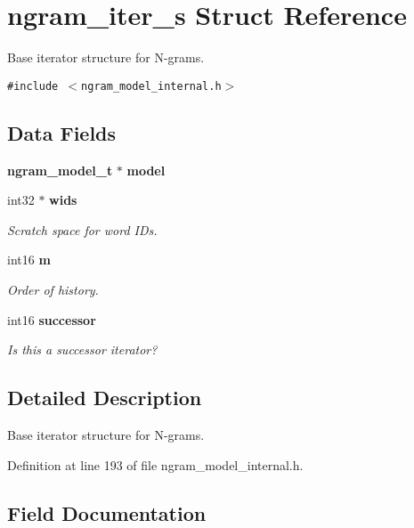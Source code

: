 \section{ngram\_\-iter\_\-s Struct Reference}
\label{structngram__iter__s}
Base iterator structure for N-grams.  


{\tt \#include $<$ngram\_\-model\_\-internal.h$>$}

\subsection*{Data Fields}
\begin{CompactItemize}
\item 
{\bf ngram\_\-model\_\-t} $\ast$ \textbf{model}\label{structngram__iter__s_6d8dff08c934f9153cffe70fd4961ec9}

\item 
int32 $\ast$ {\bf wids}
\begin{CompactList}\small\item\em Scratch space for word IDs. \item\end{CompactList}\item 
int16 {\bf m}
\begin{CompactList}\small\item\em Order of history. \item\end{CompactList}\item 
int16 {\bf successor}\label{structngram__iter__s_7802a7883b1cc246b1bff629cd2cfb08}

\begin{CompactList}\small\item\em Is this a successor iterator? \item\end{CompactList}\end{CompactItemize}


\subsection{Detailed Description}
Base iterator structure for N-grams. 

Definition at line 193 of file ngram\_\-model\_\-internal.h.

\subsection{Field Documentation}
